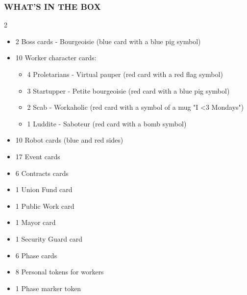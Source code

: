     \subsubsection{WHAT'S IN THE BOX}
        \begin{multicols}{2}
            \begin{itemize}
                \item 2 Boss cards - Bourgeoisie
            (blue card with a blue pig symbol)
            
                \item 10 Worker character cards:
            
                \begin{itemize}
                    \item 4 Proletarians - Virtual pauper
            (red card with a red flag symbol)
            
                    \item 3 Startupper - Petite bourgeoisie
            (red card with a blue pig symbol)
            
                    \item 2 Scab - Workaholic (red card with a
            symbol of a mug "I \textless3 Mondays")
            
                    \item 1 Luddite - Saboteur
            (red card with a bomb symbol)
            \end{itemize}
            
                \item 10 Robot cards (blue and red sides)
                \item 17 Event cards
                \item 6 Contracts cards
                \item 1 Union Fund card
                \item 1 Public Work card
                \item 1 Mayor card
                \item 1 Security Guard card
                \item 6 Phase cards
                \item 8 Personal tokens for workers
                \item 1 Phase marker token
            \end{itemize}
        \end{multicols}
